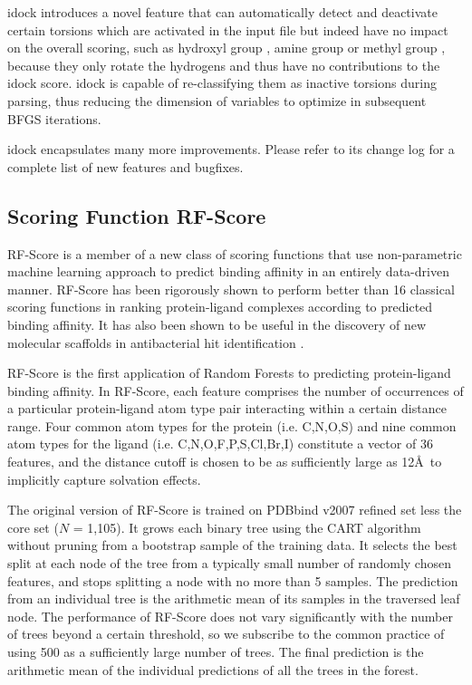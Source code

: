 idock introduces a novel feature that can automatically detect and deactivate certain torsions which are activated in the input file but indeed have no impact on the overall scoring, such as hydroxyl group , amine group  or methyl group , because they only rotate the hydrogens and thus have no contributions to the idock score. idock is capable of re-classifying them as inactive torsions during parsing, thus reducing the dimension of variables to optimize in subsequent BFGS iterations.

idock encapsulates many more improvements. Please refer to its change log for a complete list of new features and bugfixes.

\subsection{Scoring Function RF-Score}
RF-Score \cite{564} is a member of a new class of scoring functions that use non-parametric machine learning approach to predict binding affinity in an entirely data-driven manner. RF-Score has been rigorously shown \cite{564,908} to perform better than 16 classical scoring functions in ranking protein-ligand complexes according to predicted binding affinity. It has also been shown to be useful in the discovery of new molecular scaffolds in antibacterial hit identification \cite{1281}.

RF-Score is the first application of Random Forests \cite{1309} to predicting protein-ligand binding affinity. In RF-Score, each feature comprises the number of occurrences of a particular protein-ligand atom type pair interacting within a certain distance range. Four common atom types for the protein (i.e. C,N,O,S) and nine common atom types for the ligand (i.e. C,N,O,F,P,S,Cl,Br,I) constitute a vector of 36 features, and the distance cutoff is chosen to be as sufficiently large as 12\AA\ to implicitly capture solvation effects.

The original version of RF-Score \cite{564} is trained on PDBbind v2007 refined set less the core set ($N$ = 1,105). It grows each binary tree using the CART algorithm \cite{1310} without pruning from a bootstrap sample of the training data. It selects the best split at each node of the tree from a typically small number of randomly chosen features, and stops splitting a node with no more than 5 samples. The prediction from an individual tree is the arithmetic mean of its samples in the traversed leaf node. The performance of RF-Score does not vary significantly with the number of trees beyond a certain threshold, so we subscribe to the common practice of using 500 as a sufficiently large number of trees. The final prediction is the arithmetic mean of the individual predictions of all the trees in the forest.


